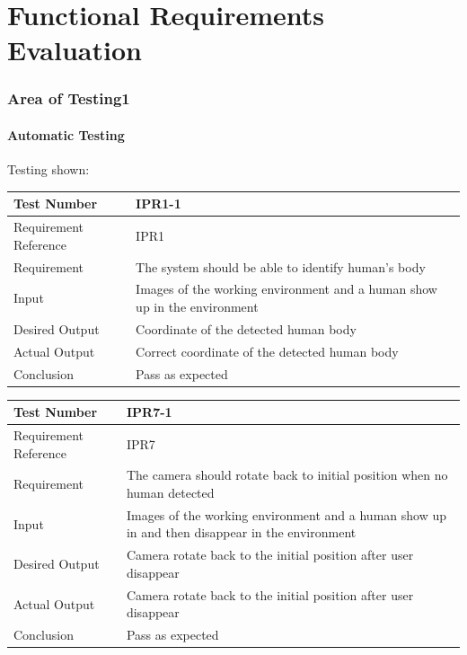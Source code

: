 \documentclass[12pt, titlepage]{article}
\begin{document}
\section{Functional Requirements Evaluation}

\subsubsection{Area of Testing1}
		
\paragraph{Automatic Testing}{Testing shown:}
\begin{table}[H]
\begin{center}
\begin{tabular}{|l | m{9cm}|}
\hline
  Test Number & IPR1-1\\
  \hline
  Requirement Reference & IPR1\\
  \hline
  Requirement &  The system should be able to identify human’s body\\
  \hline
  Input & Images of the working environment and a human show up in
the environment\\
  \hline
  Desired Output & Coordinate of the detected human body\\
  \hline
  Actual Output & Correct coordinate of the detected human body\\
  \hline
  Conclusion & Pass as expected\\
  \hline
\end{tabular}
\end{center}           
\end{table}

\begin{table}[H]
\begin{center}
\begin{tabular}{|l | m{9cm}|}
\hline
  Test Number & IPR7-1\\
  \hline
  Requirement Reference & IPR7\\
  \hline
  Requirement &  The camera should rotate back to initial position when no human detected\\
  \hline
  Input & Images of the working environment and a human show up in and then disappear in
the environment\\
  \hline
  Desired Output & Camera rotate back to the initial position after user disappear\\
  \hline
  Actual Output & Camera rotate back to the initial position after user disappear\\
  \hline
  Conclusion & Pass as expected\\
  \hline
\end{tabular}
\end{center}           
\end{table}
\end{document}
